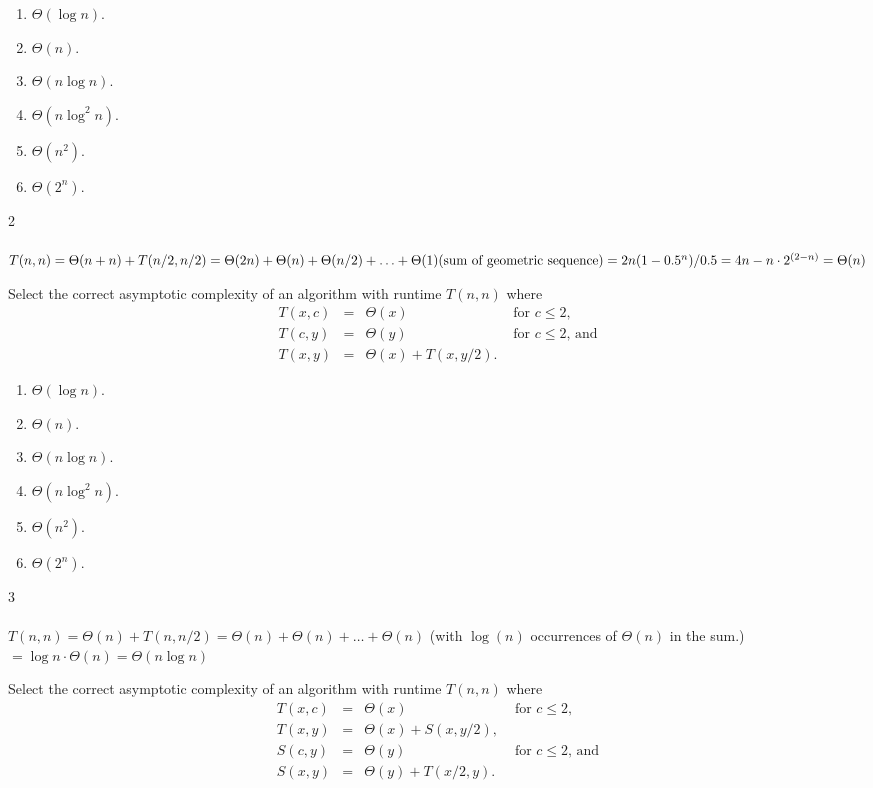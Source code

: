 \documentclass[12pt,twoside]{article}
\begin{document}
\begin{problems}
\begin{problemparts}
\begin{enumerate}
\item $\Theta(\log n)$.
\item $\Theta(n)$.
\item $\Theta(n \log n)$.
\item $\Theta(n \log^2 n)$.
\item $\Theta(n^2)$.
\item $\Theta(2^n)$.
\end{enumerate}

\ifsolution \solution{}
2
\\
\\
$T(n,n)=\Theta(n+n)+T(n/2,n/2)=\Theta(2n)+\Theta(n)+\Theta(n/2)+\ldots
+\Theta(1)\\
(\text{sum of geometric sequence})=2n(1-0.5^n)/0.5=4n-n\cdot 2^{(2-n)}=\Theta(n)$
\\
\fi

\problempart {}
Select the correct asymptotic complexity
of an algorithm with runtime $T(n, n)$
where 
$$
\begin{array}{rcll}
T(x, c) &=& \Theta(x) & \textrm{ for $c \le 2$}, \\
T(c, y) &=& \Theta(y) & \textrm{ for $c \le 2$, and} \\
T(x, y) &=& \Theta(x) + T(x, y / 2).
\end{array}
$$

\begin{enumerate}
\item $\Theta(\log n)$.
\item $\Theta(n)$.
\item $\Theta(n \log n)$.
\item $\Theta(n \log^2 n)$.
\item $\Theta(n^2)$.
\item $\Theta(2^n)$.
\end{enumerate}

\ifsolution \solution{}
3
\\
\\
$T(n,n)=\Theta(n)+T(n,n/2)=\Theta(n)+\Theta(n)+\ldots+\Theta(n)$ ({with $\log (n)$ occurrences of} $\Theta(n)$ in the sum.)$=\log n \cdot\Theta(n)=\Theta(n\log n)$
\\
\fi

\problempart {}
Select the correct asymptotic complexity
of an algorithm with runtime $T(n, n)$
where 
$$
\begin{array}{rcll}
T(x, c) &=& \Theta(x) & \textrm{ for $c \le 2$}, \\
T(x, y) &=& \Theta(x) + S(x, y / 2), \\
S(c, y) &=& \Theta(y) & \textrm{ for $c \le 2$, and} \\
S(x, y) &=& \Theta(y) + T(x / 2, y).
\end{array}
$$


\end{problemparts}
\end{problems}
\end{document}
